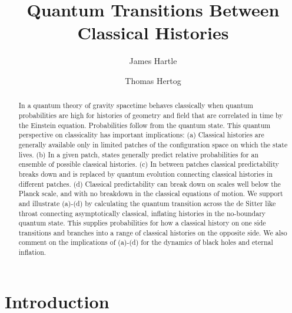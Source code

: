 \documentclass[prd,floats,superscriptaddress,eqsecnum,floatfix,nofootinbib,12pt]{revtex4}
\def\rf{}
\def\rf{}
\begin{document}
\title{Quantum Transitions Between Classical Histories}


\author{James  Hartle}
\author{Thomas Hertog}





    
\begin{abstract}
In a quantum theory of gravity spacetime behaves classically when quantum probabilities are high for histories of geometry and field  that are correlated in time by the Einstein equation. Probabilities follow from the quantum state. This quantum perspective on classicality has important implications:
(a) Classical histories are generally available only in limited patches of the configuration space on which the state lives. (b) In a given patch, states generally predict relative probabilities for an ensemble of possible classical histories. (c) In between patches classical predictability breaks down and is replaced by quantum evolution connecting classical histories in different patches. (d) Classical predictability can break down on scales well below the Planck scale, and with no breakdown in the classical equations of motion. 
We support and illustrate (a)-(d) by calculating the quantum transition across the de Sitter like throat connecting asymptotically classical, inflating histories in the no-boundary quantum state. This supplies probabilities for how a classical history on one side transitions and branches into a range of classical histories on the opposite side. We also comment on the implications of (a)-(d) for {\rf the dynamics of black holes and eternal inflation}.

\end{abstract}




\maketitle

\newpage

\section{Introduction}
\label{intro}
\end{document}
